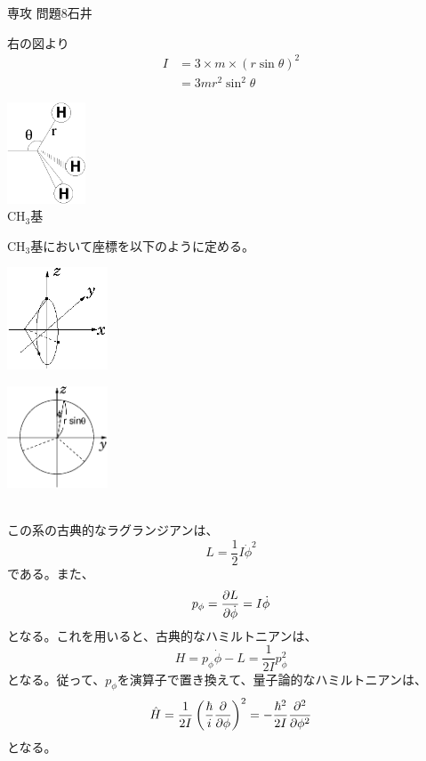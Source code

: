 \documentclass[fleqn]{jbook}
\begin{document}
\begin{answer}{専攻 問題8}{石井}

\begin{subanswers}
\SubAnswer 
\begin{subsubanswers}
\SubSubAnswer
\parbox[t]{.5\linewidth}{
右の図より
\begin{align*}
I &= 3 \times m \times (r \sin \theta )^{2}  \\
  &= 3mr^{2} \sin ^{2} \theta 
\end{align*}
}
\parbox[t]{.5\linewidth}{
\begin{center}
\includegraphics[height=3cm]{1999phy8-1.eps}\\
CH$_3$基
\end{center}
}


\SubSubAnswer
CH$_3$基において座標を以下のように定める。\\

\begin{minipage}{.45\linewidth}
\begin{center}
\includegraphics[width=3cm]{1999phy8-2.eps}
\end{center}
\end{minipage}
\begin{minipage}{.45\linewidth}
\begin{center}
\includegraphics[width=3cm]{1999phy8-3.eps}
\end{center}
\end{minipage}\\

この系の古典的なラグランジアンは、
\[
L = \frac{1}{2}I\dot{\phi}^2
\]
である。また、
\[
p_\phi = \frac{\partial L}{\partial \dot{\phi}} = I\dot{\phi}
\]
となる。これを用いると、古典的なハミルトニアンは、
\[
H = p_\phi \dot{\phi} -L = \frac{1}{2I}p_\phi^2
\]
となる。従って、$p_\phi$を演算子で置き換えて、量子論的なハミルトニアンは、
\[
\hat{H} = \frac{1}{2I}\left(\frac{\hbar}{i}\frac{\partial}{\partial \phi}\right)^2
= -\frac{\hbar^2}{2I}\frac{\partial^2}{\partial \phi^2}
\]
となる。


\end{subsubanswers}
\end{subanswers}
\end{answer}
\end{document}
